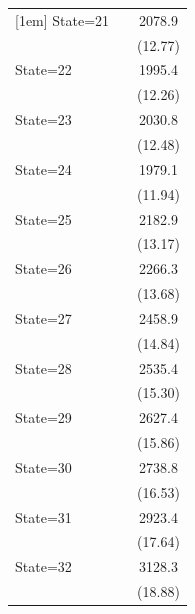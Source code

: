 \documentclass{article}
\begin{document}
{\begin{longtable}{l*{2}{c}}
[1em]
State=21            &                     &      2078.9\sym{***}\\
                    &                     &     (12.77)         \\
[1em]
State=22            &                     &      1995.4\sym{***}\\
                    &                     &     (12.26)         \\
[1em]
State=23            &                     &      2030.8\sym{***}\\
                    &                     &     (12.48)         \\
[1em]
State=24            &                     &      1979.1\sym{***}\\
                    &                     &     (11.94)         \\
[1em]
State=25            &                     &      2182.9\sym{***}\\
                    &                     &     (13.17)         \\
[1em]
State=26            &                     &      2266.3\sym{***}\\
                    &                     &     (13.68)         \\
[1em]
State=27            &                     &      2458.9\sym{***}\\
                    &                     &     (14.84)         \\
[1em]
State=28            &                     &      2535.4\sym{***}\\
                    &                     &     (15.30)         \\
[1em]
State=29            &                     &      2627.4\sym{***}\\
                    &                     &     (15.86)         \\
[1em]
State=30            &                     &      2738.8\sym{***}\\
                    &                     &     (16.53)         \\
[1em]
State=31            &                     &      2923.4\sym{***}\\
                    &                     &     (17.64)         \\
[1em]
State=32            &                     &      3128.3\sym{***}\\
                    &                     &     (18.88)         \\

\end{longtable}}
\end{document}
